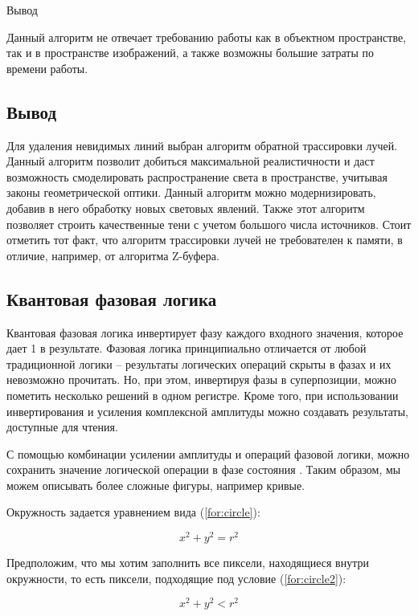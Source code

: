  Вывод
 
 Данный алгоритм не отвечает требованию работы как в объектном пространстве, так и в пространстве изображений, а также возможны большие затраты по времени работы.
 
 
\subsection*{Вывод}

Для удаления невидимых линий выбран алгоритм обратной трассировки лучей. Данный алгоритм позволит добиться максимальной реалистичности и даст возможность смоделировать распространение света в пространстве, учитывая законы геометрической оптики. Данный алгоритм можно модернизировать, добавив в него обработку новых световых явлений. Также этот алгоритм позволяет строить качественные тени с учетом большого числа источников. Стоит отметить тот факт, что алгоритм трассировки лучей не требователен к памяти, в отличие, например, от алгоритма Z-буфера.

\subsection{Квантовая фазовая логика}

Квантовая фазовая логика инвертирует фазу каждого входного значения, которое дает 1 в результате.
Фазовая логика принципиально отличается от любой традиционной логики -- результаты логических операций скрыты в фазах и их невозможно прочитать. Но, при этом, инвертируя фазы в суперпозиции, можно пометить несколько решений в одном регистре. Кроме того, при использовании инвертирования и усиления комплексной амплитуды можно создавать результаты, доступные для чтения.

С помощью комбинации усилении амплитуды и операций фазовой логики, можно сохранить значение логической операции в фазе состояния \cite{PQC-logic}. Таким образом, мы можем описывать более сложные фигуры, например кривые.

Окружность задается уравнением вида (\ref{for:circle}):

\begin{equation}
	\label{for:circle}
	x^2 + y^2 = r^2
\end{equation}

Предположим, что мы хотим заполнить все пиксели, находящиеся внутри окружности, то есть пиксели, подходящие под условие (\ref{for:circle2}):

\begin{equation}
	\label{for:circle2}
	x^2 + y^2 < r^2
\end{equation}

